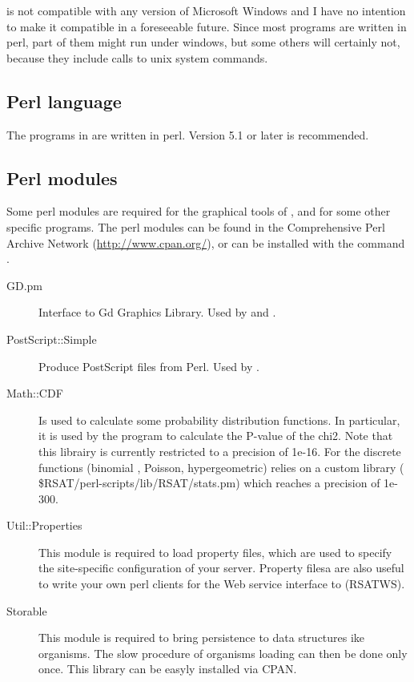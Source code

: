 \documentclass{book}
\begin{document}
\RSAT is not compatible with any version of Microsoft Windows and I
have no intention to make it compatible in a foreseeable future. Since
most programs are written in perl, part of them might run under
windows, but some others will certainly not, because they include
calls to unix system commands.

\subsection{Perl language}

The programs in \RSAT are written in perl. Version 5.1 or
later is recommended.

\subsection{Perl modules}

Some perl modules are required for the graphical tools of \RSAT, and
for some other specific programs. The perl modules can be found in the
Comprehensive Perl Archive Network (\url{http://www.cpan.org/}), or
can be installed with the command .

\begin{description}
\item[GD.pm] Interface to Gd Graphics Library. Used by
   and .

\item[PostScript::Simple] Produce PostScript files from Perl. Used by
  .

\item[Math::CDF] Is used to calculate some probability distribution
  functions. In particular, it is used by the program
   to calculate the P-value of the
  chi2. Note that this librairy is currently restricted to a precision
  of 1e-16. For the discrete functions (binomial , Poisson,
  hypergeometric) \RSAT relies on a custom library (
  \$RSAT/perl-scripts/lib/RSAT/stats.pm) which reaches a precision of
  1e-300.

\item[Util::Properties] This module is required to load property
  files, which are used to specify the site-specific configuration of
  your \RSAT server. Property filesa are also useful to write your own
  perl clients for the Web service interface to \RSAT (RSATWS).
  
\item[Storable] This module is required to bring persistence to data
  structures ike organisms. The slow procedure of organisms loading
  can then be done only once. This library can be easyly installed via
  CPAN.

\end{description}
\end{document}
